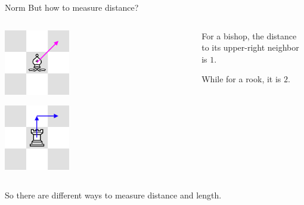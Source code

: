 \documentclass{beamer}
\begin{document}
\begin{frame}{Norm}
But how to measure distance?

\bigskip 


\pause

\begin{columns}
\begin{column}{0.5\textwidth}
    \begin{center}
     \includegraphics[width=0.35\textwidth]{chess_1.png}
     \end{center}
    \begin{center}
     \includegraphics[width=0.35\textwidth]{chess_2.png}
     \end{center}

\end{column}
\begin{column}{0.5\textwidth}  %

For a bishop, the distance to its upper-right neighbor is $1$.

\vspace{4em}

While for a rook, it is $2$.

\end{column}
\end{columns}

\pause

\bigskip 
\bigskip 

So there are different ways to measure distance and length.



\end{frame}
\end{document}
